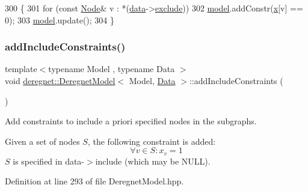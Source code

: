 \begin{DoxyCode}
300                                                        \{
301     \textcolor{keywordflow}{for} (\textcolor{keyword}{const} \hyperlink{namespacederegnet_a744bad34f2de9856d36715a445f027f3}{Node}& v : *(\hyperlink{classderegnet_1_1DeregnetModel_ad5399761cf6293a702f3800bda4806d1}{data}->\hyperlink{classderegnet_1_1DeregnetData_a8e4398e6ece11ef87767914c6f2c304d}{exclude}))
302         \hyperlink{classderegnet_1_1DeregnetModel_a30d525de2086e342b33fe3e45ede4947}{model}.addConstr(\hyperlink{classderegnet_1_1DeregnetModel_a360c980f3fec4dfbab50e9bb06a933a8}{x}[v] == 0);
303     \hyperlink{classderegnet_1_1DeregnetModel_a30d525de2086e342b33fe3e45ede4947}{model}.update();
304 \}
\end{DoxyCode}
\mbox{\label{classderegnet_1_1DeregnetModel_a6970e42a055fa0dc871d6991ac0feab4}} 
\subsubsection{\texorpdfstring{add\+Include\+Constraints()}{addIncludeConstraints()}}
{\footnotesize\ttfamily template$<$typename Model , typename Data $>$ \\
void \hyperlink{classderegnet_1_1DeregnetModel}{deregnet\+::\+Deregnet\+Model}$<$ Model, \hyperlink{avgdrgnt_8cpp_a1d1235306db276e9b36acba1db1509e8}{Data} $>$\+::add\+Include\+Constraints (\begin{DoxyParamCaption}{ }\end{DoxyParamCaption})}



Add constraints to include a priori specified nodes in the subgraphs. 

Given a set of nodes $S$, the following constraint is added\+: \[ \begin{equation} \forall v \in S: x_v = 1 \end{equation} \] $S$ is specified in data-\/$>$include (which may be N\+U\+LL). 

Definition at line 293 of file Deregnet\+Model.\+hpp.


